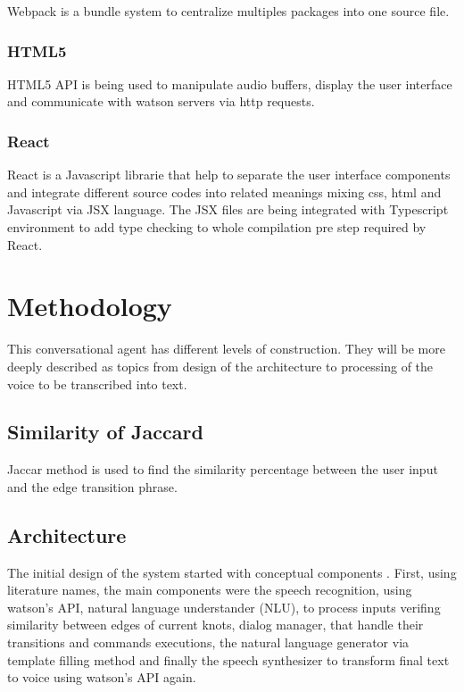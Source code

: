 \documentclass[
	article,			%
	11pt,				%
	oneside,			%
	a4paper,			%
	english,			%
	english,				%
	]{abntex2}
\begin{document}
Webpack is a bundle system to centralize multiples packages into one source file.

\subsubsection{HTML5}

HTML5 API is being used to manipulate audio buffers, display the user interface and communicate
with watson servers via http requests.

\subsubsection{React}

React is a Javascript librarie that help to separate the user interface components and integrate
different source codes into related meanings mixing css, html and Javascript via JSX language.
The JSX files are being integrated with Typescript environment to add type checking to whole
compilation pre step required by React.

\section{Methodology}

This conversational agent has different levels of construction. They will be more deeply described 
as topics from design of the architecture to processing of the voice to be transcribed into text.


\subsection{Similarity of Jaccard}

Jaccar method is used to find the similarity percentage between the user input and the edge transition
phrase.

\subsection{Architecture}

The initial design of the system started with conceptual components \cite{chatbots}. First, using literature names,
the main components were the speech recognition, using watson's API, natural language understander (NLU),
to process inputs verifing similarity between edges of current knots, dialog manager, that handle
their transitions and commands executions, the natural language generator via template filling
method and finally the speech synthesizer to transform final text to voice using watson's API again.   
\end{document}
